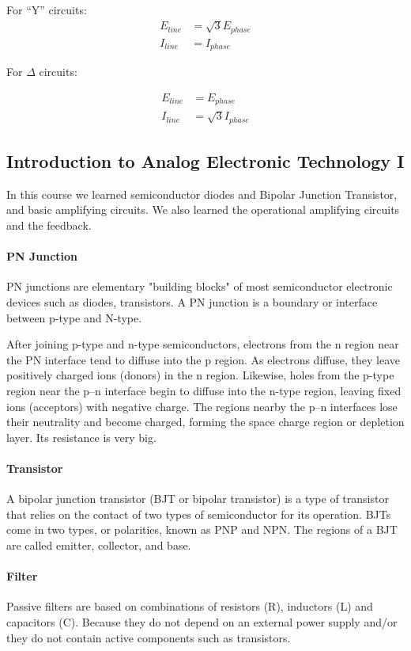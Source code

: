 For ``Y'' circuits:
\begin{align*}
  E_{line}&=\sqrt{3}E_{phase} \\
  I_{line}&=I_{phase}
\end{align*}

For $\Delta$ circuits:

\begin{align*}
  E_{line}&=E_{phase} \\
  I_{line}&=\sqrt{3}I_{phase}
\end{align*}

\subsection{Introduction to Analog Electronic Technology I}

In this course we learned semiconductor diodes and Bipolar Junction Transistor, and basic amplifying circuits. We also learned the operational amplifying circuits and the feedback.

\paragraph{PN Junction} PN junctions are elementary "building blocks" of most semiconductor electronic devices such as diodes, transistors. A PN junction is a boundary or interface between p-type and N-type.

After joining p-type and n-type semiconductors, electrons from the n region near the PN interface tend to diffuse into the p region. As electrons diffuse, they leave positively charged ions (donors) in the n region. Likewise, holes from the p-type region near the p–n interface begin to diffuse into the n-type region, leaving fixed ions (acceptors) with negative charge. The regions nearby the p–n interfaces lose their neutrality and become charged, forming the space charge region or depletion layer. Its resistance is very big.

\paragraph{Transistor} A bipolar junction transistor (BJT or bipolar transistor) is a type of transistor that relies on the contact of two types of semiconductor for its operation.
BJTs come in two types, or polarities, known as PNP and NPN. The regions of a BJT are called emitter, collector, and base.

\paragraph{Filter} Passive filters are based on combinations of resistors (R), inductors (L) and capacitors (C). Because they do not depend on an external power supply and/or they do not contain active components such as transistors.

